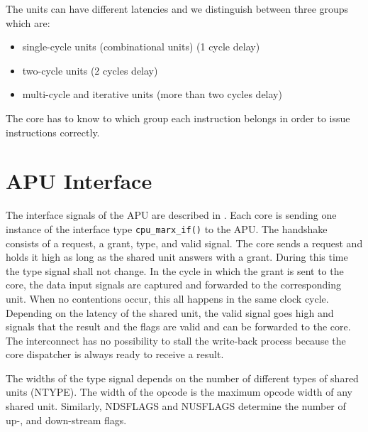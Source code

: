 \documentclass[%
 oneside,      %
 openany,      %
 halfparskip,  %
]{scrbook}
\begin{document}
The units can have different latencies and we distinguish between three groups which are:
\begin{itemize}
\item single-cycle units (combinational units) (1 cycle delay)
\item two-cycle units (2 cycles delay)
\item multi-cycle and iterative units (more than two cycles delay)
\end{itemize}
The core has to know to which group each instruction belongs in order to issue instructions correctly.

\section{APU Interface}\label{apuinterface}
The interface signals of the APU are described in . Each core is sending one instance of the interface type \texttt{cpu\_marx\_if()} to the APU. The handshake consists of a request, a grant, type, and valid signal. The core sends a request and holds it high as long as the shared unit answers with a grant. During this time the type signal shall not change. In the cycle in which the grant is sent to the core, the data input signals are captured and forwarded to the corresponding unit. When no contentions occur, this all happens in the same clock cycle.
Depending on the latency of the shared unit, the valid signal goes high and signals that the result and the flags are valid and can be forwarded to the core. The interconnect has no possibility to stall the write-back process because the core dispatcher is always ready to receive a result.

The widths of the type signal depends on the number of different types of shared units (NTYPE). The width of the opcode is the maximum opcode width of any shared unit. Similarly, NDSFLAGS and NUSFLAGS determine the number of up-, and down-stream flags.
\end{document}
